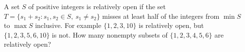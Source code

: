 A set $S$ of positive integers is relatively open if the set $T=\{s_1+s_2:s_1,s_2\in S,\ s_1\ne s_2\}$ misses at least half of the integers from $\min S$ to $\max S$ inclusive. For example $\{1,2,3,10\}$ is relatively open, but $\{1,2,3,5,6,10\}$ is not. How many nonempty subsets of $\{1,2,3,4,5,6\}$ are relatively open?
